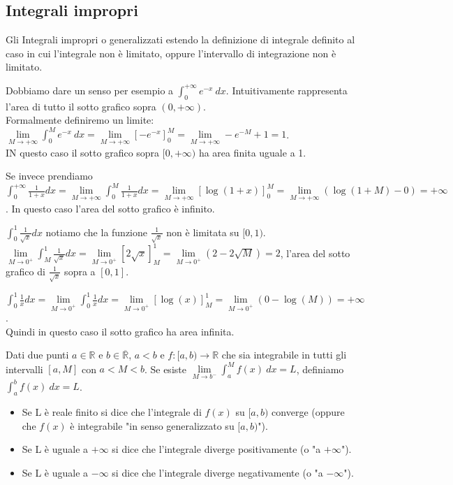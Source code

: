 \subsection{Integrali impropri}
Gli Integrali impropri o generalizzati estendo la definizione di integrale definito al caso in cui l'integrale non è limitato, oppure l'intervallo di integrazione non è limitato.
\begin{example}
Dobbiamo dare un senso per esempio a $\int_0^{+\infty}e^{-x}\:dx$. Intuitivamente rappresenta l'area di tutto il sotto grafico sopra $(0,+\infty)$.\\
Formalmente definiremo un limite: $\lim\limits_{M\to +\infty}\int_0^Me^{-x}\:dx = \lim\limits_{M\to + \infty}[-e^{-x}]^M_0=\lim\limits_{M\to +\infty}-e^{-M}+1 = 1$.\\
IN questo caso il sotto grafico sopra $[0,+\infty)$ ha area finita uguale a 1.
\end{example}
\begin{example}
Se invece prendiamo $\int_0^{+\infty}\frac{1}{1+x}dx = \lim\limits_{M\to +\infty}\int_0^{M}\frac{1}{1+x}dx = \lim\limits_{M\to +\infty}[\log(1+x)]_0^M = \lim\limits_{M\to +\infty}(\log(1+M)-0) = +\infty$. In questo caso l'area del sotto grafico è infinito.
\end{example}
\begin{example}
$\int_0^1 \frac{1}{\sqrt{x}}dx$ notiamo che la funzione $\frac{1}{\sqrt{x}}$ non è limitata su $[0,1)$.\\
$\lim\limits_{M\to 0^+}\int_M^1 \frac{1}{\sqrt{x}}dx = \lim\limits_{M\to 0^+}[2\sqrt{x}]_M^1 = \lim\limits_{M\to 0^+}(2-2\sqrt{M}) = 2$, l'area del sotto grafico di $\frac{1}{\sqrt{x}}$ sopra a $[0,1]$.
\end{example}
\begin{example}
$\int_0^1 \frac{1}{x}dx = \lim\limits_{M\to 0^+}\int_0^1 \frac{1}{x}dx = \lim\limits_{M\to 0^+}[\log(x)]_M^1 = \lim\limits_{M\to 0^+} (0-\log(M)) = + \infty$.\\
Quindi in questo caso il sotto grafico ha area infinita.
\end{example}
\begin{definition}
Dati due punti $a\in \mathbb{R}$ e $b \in \mathbb{\overline{R}}$, $a<b$ e $f:[a,b)\to \mathbb{R}$ che sia integrabile in tutti gli intervalli $[a,M]$ con $a<M<b$. Se esiste $\lim\limits_{M\to b^-}\int_a^M f(x)\:dx = L$, definiamo $\int_a^b f(x)\:dx = L$. 
\begin{itemize}
    \item Se L è reale finito si dice che l'integrale di $f(x)$ su $[a,b)$ converge (oppure che $f(x)$ è integrabile "in senso generalizzato su $[a,b)$").
    \item Se L è uguale a $+\infty$ si dice che l'integrale diverge positivamente (o "a $+\infty$").
    \item Se L è uguale a $-\infty$ si dice che l'integrale diverge negativamente (o "a $-\infty$").
\end{itemize}
\end{definition}
